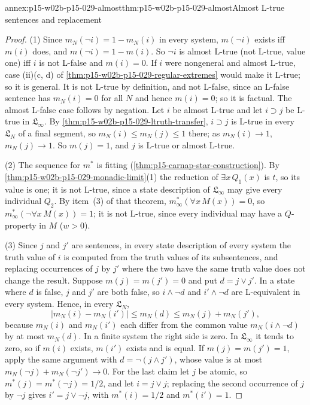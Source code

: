 \begin{annexitem}{annex:p15-w02b-p15-029-almost}{thm:p15-w02b-p15-029-almost}{Almost L-true sentences and replacement}
\begin{proof}
(1) Since \(m_N(\neg i)=1-m_N(i)\) in every system,
\(m(\neg i)\) exists iff \(m(i)\) does, and \(m(\neg i)=1-m(i)\). So
\(\neg i\) is almost L-true (not L-true, value one) iff \(i\) is not
L-false and \(m(i)=0\). If \(i\) were nongeneral and almost L-true,
case (ii)(c, d) of \cref{thm:p15-w02b-p15-029-regular-extremes} would
make it L-true; so it is general. It is not L-true by definition, and
not L-false, since an L-false sentence has \(m_N(i)=0\) for all \(N\)
and hence \(m(i)=0\); so it is factual. The almost L-false case follows
by negation. Let \(i\) be almost L-true and let \(i\supset j\) be
L-true in \(\mathfrak L_\infty\). By
\cref{thm:p15-w02b-p15-029-ltruth-transfer}, \(i\supset j\) is L-true
in every \(\mathfrak L_N\) of a final segment, so
\(m_N(i)\leq m_N(j)\leq1\) there; as \(m_N(i)\to1\), \(m_N(j)\to1\).
So \(m(j)=1\), and \(j\) is L-true or almost L-true.

(2) The sequence for \(m^*\) is fitting
(\cref{thm:p15-carnap-star-construction}). By
\cref{thm:p15-w02b-p15-029-monadic-limit}(1) the reduction of
\(\exists x\,Q_1(x)\) is \(t\), so its value is one; it is not L-true,
since a state description of \(\mathfrak L_\infty\) may give every
individual \(Q_2\). By item~(3) of that theorem,
\(m^*_\infty(\forall x\,M(x))=0\), so \(m^*_\infty(\neg\forall x\,M(x))=1\);
it is not L-true, since every individual may have a \(Q\)-property in
\(M\) (\(w>0\)).

(3) Since \(j\) and \(j'\) are sentences, in every state description of
every system the truth value of \(i\) is computed from the truth values
of its subsentences, and replacing occurrences of \(j\) by \(j'\) where
the two have the same truth value does not change the result. Suppose
\(m(j)=m(j')=0\) and put \(d=j\lor j'\). In a state where \(d\) is
false, \(j\) and \(j'\) are both false, so \(i\land\neg d\) and
\(i'\land\neg d\) are L-equivalent in every system. Hence, in every
\(\mathfrak L_N\),
\[
 \lvert m_N(i)-m_N(i')\rvert
 \leq m_N(d)\leq m_N(j)+m_N(j'),
\]
because \(m_N(i)\) and \(m_N(i')\) each differ from the common value
\(m_N(i\land\neg d)\) by at most \(m_N(d)\). In a finite system the
right side is zero. In \(\mathfrak L_\infty\) it tends to zero, so if
\(m(i)\) exists, \(m(i')\) exists and is equal. If
\(m(j)=m(j')=1\), apply the same argument with \(d=\neg(j\land j')\),
whose value is at most \(m_N(\neg j)+m_N(\neg j')\to0\). For the last
claim let \(j\) be atomic, so \(m^*(j)=m^*(\neg j)=1/2\), and let
\(i=j\lor j\); replacing the second occurrence of \(j\) by \(\neg j\)
gives \(i'=j\lor\neg j\), with \(m^*(i)=1/2\) and \(m^*(i')=1\).
\end{proof}
\end{annexitem}

